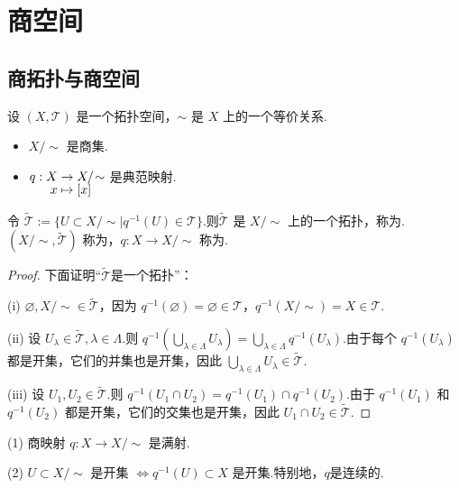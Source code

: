 \chapter{商空间}

\section{商拓扑与商空间}

\begin{definition}[商空间][def:8.1]
    设 $(X, \mathcal{T})$ 是一个拓扑空间，$\sim$ 是 $X$ 上的一个等价关系.
    \begin{itemize}
        \item $X/\!\sim$ 是商集.
        \item $\setjot[-2]\begin{aligned}[t]
            q: X &\to X/\!\sim \\
            x &\mapsto [x]
        \end{aligned}$ 是典范映射.
    \end{itemize}
    令 $\tilde{\mathcal{T}} := \{ U \subset X/\!\sim \mid q^{-1}(U) \in \mathcal{T} \}$.则$\tilde{\mathcal{T}}$ 是 $X/\!\sim$ 上的一个拓扑，称为. $(X/\!\sim, \tilde{\mathcal{T}})$ 称为，$q:X\to X/\!\sim$ 称为.
\end{definition}
\begin{proof}
    下面证明“$\tilde{\mathcal{T}}$是一个拓扑”： \par
    (i) $\varnothing, X/\!\sim \in \tilde{\mathcal{T}}$，因为 $q^{-1}(\varnothing)=\varnothing \in \mathcal{T}$，$q^{-1}(X/\!\sim)=X \in \mathcal{T}$.

    (ii) 设 $U_\lambda \in \tilde{\mathcal{T}}, \lambda \in \Lambda$.则 $q^{-1}(\bigcup_{\lambda \in \Lambda} U_\lambda) = \bigcup_{\lambda \in \Lambda} q^{-1}(U_\lambda)$.由于每个 $q^{-1}(U_\lambda)$ 都是开集，它们的并集也是开集，因此 $\bigcup_{\lambda \in \Lambda} U_\lambda \in \tilde{\mathcal{T}}$.

    (iii) 设 $U_1, U_2 \in \tilde{\mathcal{T}}$.则 $q^{-1}(U_1 \cap U_2) = q^{-1}(U_1) \cap q^{-1}(U_2)$.由于 $q^{-1}(U_1)$ 和 $q^{-1}(U_2)$ 都是开集，它们的交集也是开集，因此 $U_1 \cap U_2 \in \tilde{\mathcal{T}}$.
\end{proof}

\begin{remark}
    (1) 商映射 $q: X \to X/\!\sim$ 是满射.\par
    (2) $U \subset X/\!\sim$ 是开集 $\iff q^{-1}(U) \subset X$ 是开集.特别地，$q$是连续的.
\end{remark}

